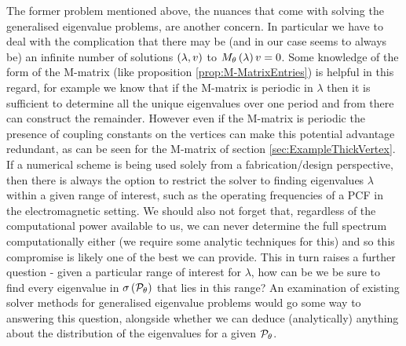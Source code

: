 The former problem mentioned above, the nuances that come with solving the generalised eigenvalue problems, are another concern.
In particular we have to deal with the complication that there may be (and in our case seems to always be) an infinite number of solutions $\left( \lambda,v \right)$ to $M_{\theta}\left( \lambda \right) v = 0$.
Some knowledge of the form of the M-matrix (like proposition \ref{prop:M-MatrixEntries}) is helpful in this regard, for example we know that if the M-matrix is periodic in $\lambda$ then it is sufficient to determine all the unique eigenvalues over one period and from there can construct the remainder.
However even if the M-matrix is periodic the presence of coupling constants on the vertices can make this potential advantage redundant, as can be seen for the M-matrix of section \ref{sec:ExampleThickVertex}.
If a numerical scheme is being used solely from a fabrication/design perspective, then there is always the option to restrict the solver to finding eigenvalues $\lambda$ within a given range of interest, such as the operating frequencies of a PCF in the electromagnetic setting.
We should also not forget that, regardless of the computational power available to us, we can never determine the full spectrum computationally either (we require some analytic techniques for this) and so this compromise is likely one of the best we can provide.
This in turn raises a further question - given a particular range of interest for $\lambda$, how can be we be sure to find every eigenvalue in $\sigma\left( \mathcal{P}_{\theta} \right)$ that lies in this range?
An examination of existing solver methods for generalised eigenvalue problems would go some way to answering this question, alongside whether we can deduce (analytically) anything about the distribution of the eigenvalues for a given $\mathcal{P}_{\theta}$.

